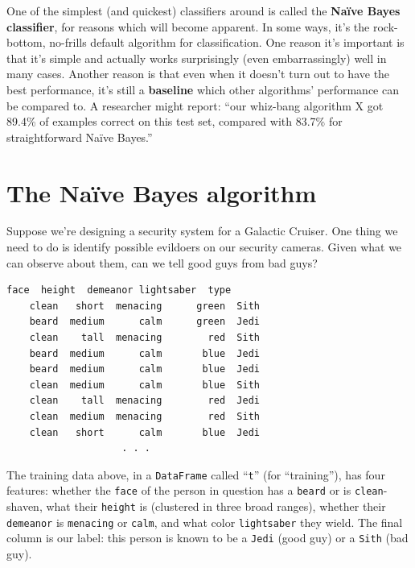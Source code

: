 
One of the simplest (and quickest) classifiers around is called the
\textbf{Na\"{i}ve Bayes classifier}, for reasons which will become apparent. In
some ways, it's the rock-bottom, no-frills default algorithm for
classification. One reason it's important is that it's simple and actually
works surprisingly (even embarrassingly) well in many cases. Another reason is
that even when it doesn't turn out to have the best performance, it's still a
\textbf{baseline} which other algorithms' performance can be compared to. A
researcher might report: ``our whiz-bang algorithm X got 89.4\% of examples
correct on this test set, compared with 83.7\% for straightforward Na\"{i}ve
Bayes.''

\section{The Na\"{i}ve Bayes algorithm}


Suppose we're designing a security system for a Galactic Cruiser. One thing we
need to do is identify possible evildoers on our security cameras. Given what
we can observe about them, can we tell good guys from bad guys?

\label{jediTraining}

\begin{Verbatim}[fontsize=\small,samepage=true,frame=leftline,framesep=5mm,framerule=1mm]
     face  height  demeanor lightsaber  type
    clean   short  menacing      green  Sith
    beard  medium      calm      green  Jedi
    clean    tall  menacing        red  Sith
    beard  medium      calm       blue  Jedi
    beard  medium      calm       blue  Jedi
    clean  medium      calm       blue  Sith
    clean    tall  menacing        red  Jedi
    clean  medium  menacing        red  Sith
    clean   short      calm       blue  Jedi
                    . . .
\end{Verbatim}


The training data above, in a \texttt{DataFrame} called ``\texttt{t}'' (for
``training''), has four features: whether the \texttt{face} of the person in
question has a \texttt{beard} or is \texttt{clean}-shaven, what their
\texttt{height} is (clustered in three broad ranges), whether their
\texttt{demeanor} is \texttt{menacing} or \texttt{calm}, and what color
\texttt{lightsaber} they wield. The final column is our label: this person is
known to be a \texttt{Jedi} (good guy) or a \texttt{Sith} (bad guy).


